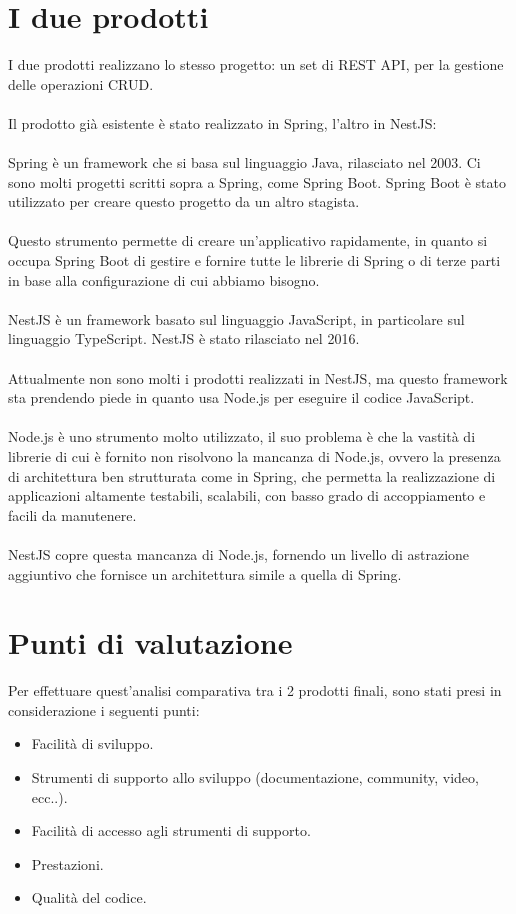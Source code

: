 \section{I due prodotti}
I due prodotti realizzano lo stesso progetto: un set di REST API, per la gestione delle operazioni CRUD.
\\\\
Il prodotto già esistente è stato realizzato in Spring, l'altro in NestJS:
\\\\
Spring è un framework che si basa sul linguaggio Java, rilasciato nel 2003. Ci sono molti progetti scritti
sopra a Spring, come Spring Boot. Spring Boot è stato utilizzato per creare questo progetto da un altro 
stagista.
\\\\
Questo strumento permette di creare un'applicativo rapidamente, in quanto si occupa Spring Boot di gestire
e fornire tutte le librerie di Spring o di terze parti in base alla configurazione di cui abbiamo bisogno.
\\\\
NestJS è un framework basato sul linguaggio JavaScript, in particolare sul linguaggio TypeScript. NestJS è
stato rilasciato nel 2016.
\\\\
Attualmente non sono molti i prodotti realizzati in NestJS, ma questo framework sta prendendo piede in quanto
usa Node.js per eseguire il codice JavaScript.
\\\\
Node.js è uno strumento molto utilizzato, il suo problema è che la vastità di librerie di cui è fornito non 
risolvono la mancanza di Node.js, ovvero la presenza di architettura ben strutturata come in Spring, che 
permetta la realizzazione di applicazioni altamente testabili, scalabili, con basso grado di accoppiamento
e facili da manutenere.
\\\\
NestJS copre questa mancanza di Node.js, fornendo un livello di astrazione aggiuntivo che fornisce un
architettura simile a quella di Spring.

\section{Punti di valutazione}
Per effettuare quest'analisi comparativa tra i 2 prodotti finali, sono stati presi in considerazione i seguenti 
punti:
\begin{itemize}
    \item Facilità di sviluppo.
    \item Strumenti di supporto allo sviluppo (documentazione, community, video, ecc..).
    \item Facilità di accesso agli strumenti di supporto.
    \item Prestazioni.
    \item Qualità del codice.
\end{itemize}

